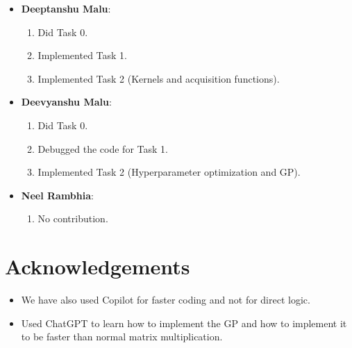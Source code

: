 \documentclass[11pt]{article}
\begin{document}
\begin{itemize}
    \item \textbf{Deeptanshu Malu}:
    \begin{enumerate}
        \item Did Task 0.
        \item Implemented Task 1.
        \item Implemented Task 2 (Kernels and acquisition functions).
    \end{enumerate}

    \item \textbf{Deevyanshu Malu}:
    \begin{enumerate}
        \item Did Task 0.
        \item Debugged the code for Task 1.
        \item Implemented Task 2 (Hyperparameter optimization and GP).
    \end{enumerate}

    \item \textbf{Neel Rambhia}:
    \begin{enumerate}
        \item No contribution.
    \end{enumerate}
\end{itemize}

\section*{Acknowledgements}

\begin{itemize}
    \item We have also used Copilot for faster coding and not for direct logic.
    \item Used ChatGPT to learn how to implement the GP and how to implement it to be faster than normal matrix multiplication.
\end{itemize}
\end{document}
